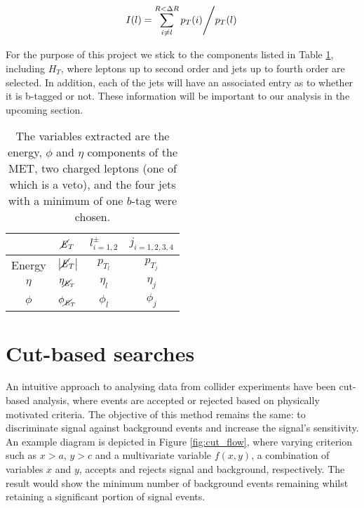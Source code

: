 \begin{equation}
    \left. I(l) = \sum\limits_{i\ne l}^{R<\Delta R} p_T(i) \middle/ p_T(l) \right. \\
    \label{eq:iso}
\end{equation}


For the purpose of this project we stick to the components listed in Table \ref{tab:variables}, including $H_T$, where leptons up to second order and jets up to fourth order are selected. In addition, each of the jets will have an associated entry as to whether it is b-tagged or not. These information will be important to our analysis in the upcoming section. \\ 


\begin{table}[htbp]
    \centering
    \begin{tabular}{c|c|c|c} 
    \toprule
     & $\cancel{\it{E}}_{T}$ & $l^{\pm}_{i=1,2}$ & $j_{i=1,2,3,4}$ \\
    \midrule
    \rowcolor{gray!6} Energy & $\abs{\cancel{\it{E}}_{T}}$ & $ p_{T_l} $ & $ p_{T_j} $ \\
    $\eta$ & $\eta_{\cancel{\it{E}}_{T}}$ & $ \eta_l $ & $ \eta_j $ \\
    \rowcolor{gray!6} $\phi$ & $\phi_{\cancel{\it{E}}_{T}}$ & $ \phi_l $ & $ \phi_j $ \\
    \bottomrule
    \end{tabular}
    \caption{The variables extracted are the energy, $\phi$ and $\eta$ components of the MET, two charged leptons (one of which is a veto), and the four jets with a minimum of one $b$-tag were chosen.} 
    \label{tab:variables}
\end{table}

\section{Cut-based searches}
\label{sec:cut}
An intuitive approach to analysing data from collider experiments have been cut-based analysis, where events are accepted or rejected based on physically motivated criteria. The objective of this method remains the same: to discriminate signal against background events and increase the signal's sensitivity. An example diagram is depicted in Figure \ref{fig:cut_flow}, where varying criterion such as $x>a$, $y>c$ and a multivariate variable $f(x,y)$, a combination of variables $x$ and $y$, accepts and rejects signal and background, respectively. The result would show the minimum number of background events remaining whilst retaining a significant portion of signal events.  \\

